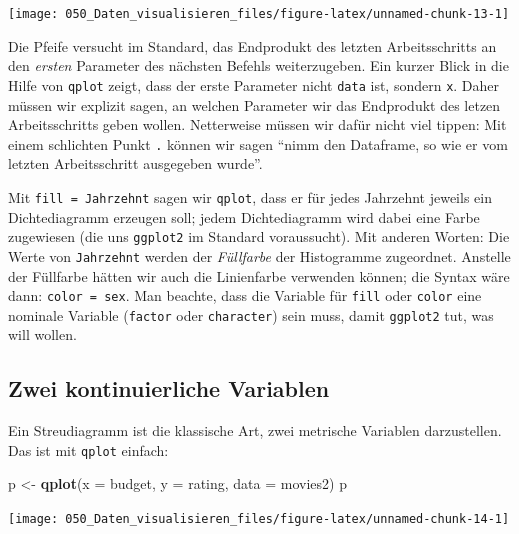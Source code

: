 \documentclass[12pt,ngerman,]{book}
\makeatletter
\newenvironment{Shaded}{\begin{snugshade}}{\end{snugshade}}
\newcommand{\KeywordTok}[1]{\textcolor[rgb]{0.13,0.29,0.53}{\textbf{#1}}}
\newcommand{\DataTypeTok}[1]{\textcolor[rgb]{0.13,0.29,0.53}{#1}}
\newcommand{\StringTok}[1]{\textcolor[rgb]{0.31,0.60,0.02}{#1}}
\newcommand{\NormalTok}[1]{#1}
\newenvironment{kframe}{%
\medskip{}
\setlength{\fboxsep}{.8em}
 \def\at@end@of@kframe{}%
 \ifinner\ifhmode%
  \def\at@end@of@kframe{\end{minipage}}%
  \begin{minipage}{\columnwidth}%
 \fi\fi%
 \def\FrameCommand##1{\hskip\@totalleftmargin \hskip-\fboxsep
 \colorbox{shadecolor}{##1}\hskip-\fboxsep
     \hskip-\linewidth \hskip-\@totalleftmargin \hskip\columnwidth}%
 \MakeFramed {\advance\hsize-\width
   \@totalleftmargin\z@ \linewidth\hsize
   \@setminipage}}%
 {\par\unskip\endMakeFramed%
 \at@end@of@kframe}
\renewenvironment{Shaded}{\begin{kframe}}{\end{kframe}}
\theoremstyle{definition}
\theoremstyle{definition}
\theoremstyle{remark}
\makeatother
\begin{document}
\begin{center}\texttt{[image: 050\_Daten\_visualisieren\_files/figure-latex/unnamed-chunk-13-1]} \end{center}

Die Pfeife versucht im Standard, das Endprodukt des letzten
Arbeitsschritts an den \emph{ersten} Parameter des nächsten Befehls
weiterzugeben. Ein kurzer Blick in die Hilfe von \texttt{qplot} zeigt,
dass der erste Parameter nicht \texttt{data} ist, sondern \texttt{x}.
Daher müssen wir explizit sagen, an welchen Parameter wir das Endprodukt
des letzen Arbeitsschritts geben wollen. Netterweise müssen wir dafür
nicht viel tippen: Mit einem schlichten Punkt \texttt{.} können wir
sagen ``nimm den Dataframe, so wie er vom letzten Arbeitsschritt
ausgegeben wurde''.

Mit \texttt{fill\ =\ Jahrzehnt} sagen wir \texttt{qplot}, dass er für
jedes Jahrzehnt jeweils ein Dichtediagramm erzeugen soll; jedem
Dichtediagramm wird dabei eine Farbe zugewiesen (die uns
\texttt{ggplot2} im Standard voraussucht). Mit anderen Worten: Die Werte
von \texttt{Jahrzehnt} werden der \emph{Füllfarbe} der Histogramme
zugeordnet. Anstelle der Füllfarbe hätten wir auch die Linienfarbe
verwenden können; die Syntax wäre dann: \texttt{color\ =\ sex}. Man
beachte, dass die Variable für \texttt{fill} oder \texttt{color} eine
nominale Variable (\texttt{factor} oder \texttt{character}) sein muss,
damit \texttt{ggplot2} tut, was will wollen.

\subsection{Zwei kontinuierliche
Variablen}\label{zwei-kontinuierliche-variablen}

Ein Streudiagramm ist die klassische Art, zwei metrische Variablen
darzustellen. Das ist mit \texttt{qplot} einfach:

\begin{Shaded}
\begin{Highlighting}[]
\NormalTok{p <-}\StringTok{ }\KeywordTok{qplot}\NormalTok{(}\DataTypeTok{x =}\NormalTok{ budget, }\DataTypeTok{y =}\NormalTok{ rating, }\DataTypeTok{data =}\NormalTok{ movies2)}
\NormalTok{p}
\end{Highlighting}
\end{Shaded}

\begin{center}\texttt{[image: 050\_Daten\_visualisieren\_files/figure-latex/unnamed-chunk-14-1]} \end{center}
\end{document}
